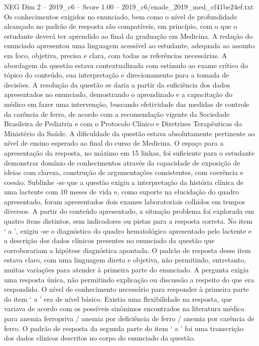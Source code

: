 \begin{textsample}{NEG Dim 2 – 2019\_c6 – Score 1.00 – 2019\_c6/enade\_2019\_med\_cf41be24ef.txt}
Os conhecimentos exigidos no enunciado, bem como o nível de profundidade alcançado no padrão de resposta são compatíveis, em princípio, com o que o estudante deverá ter aprendido ao final da graduação em Medicina.
A redação do enunciado apresentou uma linguagem acessível ao estudante, adequada ao assunto em foco, objetiva, precisa e clara, com todas as referências necessárias.
A abordagem da questão estava contextualizada com estímulo ao exame crítico do tópico do conteúdo, sua interpretação e direcionamento para a tomada de decisões.
A resolução da questão se daria a partir da suficiência dos dados apresentados no enunciado, demostrando o aprendizado e a capacitação do médico em fazer uma intervenção, buscando efetividade das medidas de controle da carência de ferro, de acordo com a recomendação vigente da Sociedade Brasileira de Pediatria e com o Protocolo Clínico e Diretrizes Terapêuticas do Ministério da Saúde.
A dificuldade da questão estava absolutamente pertinente ao nível de ensino esperado ao final do curso de Medicina.
O espaço para a apresentação da resposta, no máximo em 15 linhas, foi suficiente para o estudante demonstrar domínio de conhecimentos através da capacidade de exposição de ideias com clareza, construção de argumentações consistentes, com coerência e coesão.
Sublinhe -se que a questão exigiu a interpretação da história clínica de uma lactente com 10 meses de vida e, como suporte na elucidação do quadro apresentado, foram apresentados dois exames laboratoriais colhidos em tempos diversos.
A partir do conteúdo apresentado, a situação problema foi explorada em quatro itens distintos, sem indicadores ou pistas para a resposta correta.
No item ‘ a ’, exigiu -se o diagnóstico do quadro hematológico apresentado pelo lactente e a descrição dos dados clínicos presentes no enunciado da questão que corroborariam a hipótese diagnóstica apontada.
O padrão de resposta desse item estava claro, com uma linguagem direta e objetiva, não permitindo, entretanto, muitas variações para atender à primeira parte do enunciado.
A pergunta exigia uma resposta única, não permitindo explicação ou discussão a respeito do que era respondido.
O nível de conhecimento necessário para responder à primeira parte do item ‘ a ’ era de nível básico.
Existia uma flexibilidade na resposta, que variava de acordo com os possíveis sinônimos encontrados na literatura médica para anemia ferropriva / anemia por deficiência de ferro / anemia por carência de ferro.
O padrão de resposta da segunda parte do item ‘ a ’ foi uma transcrição dos dados clínicos descritos no corpo do enunciado da questão.

\end{textsample}
